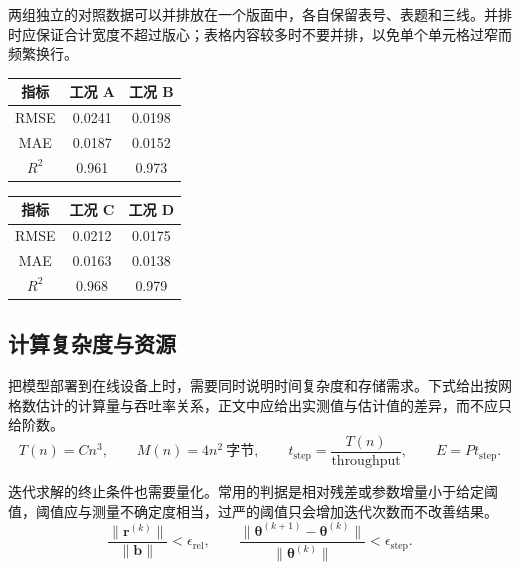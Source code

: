 两组独立的对照数据可以并排放在一个版面中，各自保留表号、表题和三线。并排时应保证合计宽度不超过版心；表格内容较多时不要并排，以免单个单元格过窄而频繁换行。
\begin{center}
  \begin{minipage}[t]{0.48\textwidth}
    \centering
    \captionsetup{type=table}
    \caption{两组工况的误差指标}
    \label{tab:metrics-ab}
    \begin{tabular}{ccc}
      \toprule
      指标 & 工况 A & 工况 B\\
      \midrule
      RMSE & 0.0241 & 0.0198\\
      MAE & 0.0187 & 0.0152\\
      $R^2$ & 0.961 & 0.973\\
      \bottomrule
    \end{tabular}
  \end{minipage}
  \hfill
  \begin{minipage}[t]{0.48\textwidth}
    \centering
    \captionsetup{type=table}
    \caption{另外两组工况的误差指标}
    \label{tab:metrics-cd}
    \begin{tabular}{ccc}
      \toprule
      指标 & 工况 C & 工况 D\\
      \midrule
      RMSE & 0.0212 & 0.0175\\
      MAE & 0.0163 & 0.0138\\
      $R^2$ & 0.968 & 0.979\\
      \bottomrule
    \end{tabular}
  \end{minipage}
\end{center}

\subsection{计算复杂度与资源}

把模型部署到在线设备上时，需要同时说明时间复杂度和存储需求。下式给出按网格数估计的计算量与吞吐率关系，正文中应给出实测值与估计值的差异，而不应只给阶数。
\begin{equation}
  T(n)=Cn^3,\qquad M(n)=4n^2\ \text{字节},\qquad
  t_{\mathrm{step}}=\frac{T(n)}{\text{throughput}},\qquad
  E=Pt_{\mathrm{step}}.
  \label{eq:complexity}
\end{equation}

迭代求解的终止条件也需要量化。常用的判据是相对残差或参数增量小于给定阈值，阈值应与测量不确定度相当，过严的阈值只会增加迭代次数而不改善结果。
\begin{equation}
  \frac{\|\bm{r}^{(k)}\|}{\|\bm{b}\|}<\epsilon_{\mathrm{rel}},\qquad
  \frac{\|\bm{\theta}^{(k+1)}-\bm{\theta}^{(k)}\|}
  {\|\bm{\theta}^{(k)}\|}<\epsilon_{\mathrm{step}}.
  \label{eq:stopping}
\end{equation}

